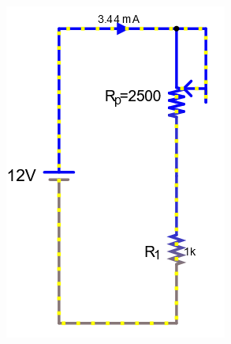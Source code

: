 \documentclass[a4paper]{article}
\begin{document}
\begin{figure}[H]
\begin{subfigure}{0.333\textwidth}
        \includegraphics[width=.9\linewidth]{amp12}
    \end{subfigure}
    \begin{subfigure}{0.333\textwidth}

\end{subfigure}
\end{figure}
\end{document}
